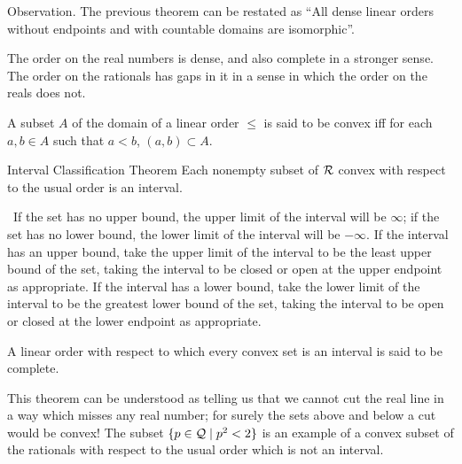 \begin{ThmEtc}{Observation.}
 The previous theorem can be restated as ``All
 dense linear orders without endpoints and with
 countable domains are isomorphic''.
\end{ThmEtc}

The order on the real numbers is dense, and
also complete in a 
stronger sense.  The order on the rationals has gaps in it in a sense in which the order on the reals does not.

\begin{definition}
 A subset $A$ of the domain of a linear order $\leq$ is said to be {\upshape convex} iff for each $a,b \in A$ such
 that $a<b$, $(a,b) \subset A$.
\end{definition}

\begin{Thm}{Interval Classification Theorem}
 Each nonempty subset of $\cal
 R$ convex with respect to the usual order is an interval.
\end{Thm}

\preuve\ If the set has no upper bound, the upper limit of
the interval will be $\infty$; if the set has no lower
bound, the lower 
limit of the interval will be $-\infty$.  If the interval has an upper
bound, take the upper limit of the interval to be the least upper
bound of the set, taking the interval to be closed or
open at the upper endpoint as appropriate.  If the interval has a lower bound,
take the lower limit of the interval to be the greatest lower
bound of 
the set, taking the interval to be open or closed at the lower
endpoint as appropriate.
\finpreuve

\begin{definition}
 A linear order with respect to which
 every convex set is an interval is said to be {\upshape complete}.
\end{definition}

This theorem can be understood as telling us that we cannot cut the
real line in a way which misses any real number; for surely
the sets above and below a cut would be convex!  The subset $\{p \in {\cal Q}
\mid p^2 < 2\}$ is an example of a convex subset of the rationals with respect to the usual order which is not an interval.

